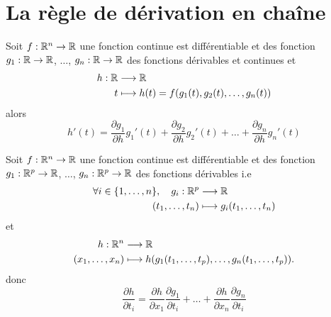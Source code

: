 \section{La règle de dérivation en chaîne}

\begin{definition}
Soit $f: \mathbb{R}^n \to \mathbb{R}$ une fonction continue est différentiable et des fonction $g_1: \mathbb{R} \to \mathbb{R}$, $\ldots$, $g_n: \mathbb{R} \to \mathbb{R}$ des fonctions dérivables et continues et  
\begin{align*}
    h: \mathbb{R} &\longrightarrow \mathbb{R} \\
    t &\longmapsto h(t) = f(g_1(t), g_2(t), \ldots, g_n(t))
\end{align*}
alors 
\[
h'(t) = \frac{\partial g_1}{\partial h}g_1'(t) + \frac{\partial g_2}{\partial h}g_2'(t) + \ldots + \frac{\partial g_n}{\partial h}g_n'(t)
\] 
\end{definition}

\begin{definition}
Soit $f: \mathbb{R}^n \to \mathbb{R}$ une fonction continue est différentiable et des fonction $g_1: \mathbb{R}^p \to \mathbb{R}$, $\ldots$, $g_n: \mathbb{R}^p \to \mathbb{R}$ des fonctions dérivables 
i.e 
\begin{align*}
    \forall i \in \{ 1, \ldots, n\}, \quad
    g_i : \mathbb{R}^p &\longrightarrow \mathbb{R} \\
    (t_1, \ldots, t_n)&\longmapsto g_i(t_1, \ldots, t_n) 
\end{align*}
et  
\begin{align*}
    h: \mathbb{R}^n &\longrightarrow \mathbb{R} \\
    (x_1, \ldots, x_n) &\longmapsto h(g_1(t_1, \ldots, t_p), \ldots, g_n(t_1, \ldots, t_p)) 
.\end{align*}
donc 
\[
\frac{\partial h}{\partial t_i} = \frac{\partial h}{\partial x_1}\frac{\partial g_1}{\partial t_i} + \ldots + \frac{\partial h}{\partial x_n}\frac{\partial g_n}{\partial t_i}
\] 
\end{definition}
